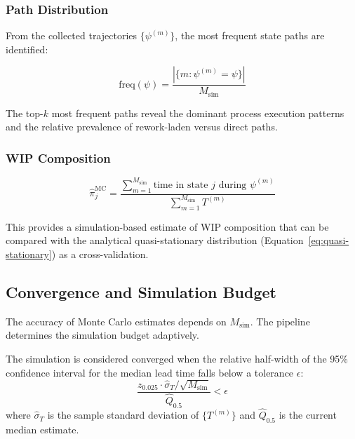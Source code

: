 \subsubsection{Path Distribution}

From the collected trajectories $\{\psi^{(m)}\}$, the most frequent 
state paths are identified:

\begin{equation}
\label{eq:path-freq}
\text{freq}(\psi) = \frac{|\{m : \psi^{(m)} = \psi\}|}{M_{\text{sim}}}
\end{equation}

The top-$k$ most frequent paths reveal the dominant process execution 
patterns and the relative prevalence of rework-laden versus direct 
paths.

\subsubsection{WIP Composition}

\begin{equation}
\label{eq:wip-composition}
\hat{\pi}_j^{\text{MC}} = \frac{\sum_{m=1}^{M_{\text{sim}}} 
    \text{time in state } j \text{ during } \psi^{(m)}}
    {\sum_{m=1}^{M_{\text{sim}}} T^{(m)}}
\end{equation}

This provides a simulation-based estimate of WIP composition that can 
be compared with the analytical quasi-stationary distribution 
(Equation~\ref{eq:quasi-stationary}) as a cross-validation.


\subsection{Convergence and Simulation Budget}
\label{sec:s4-convergence}

The accuracy of Monte Carlo estimates depends on $M_{\text{sim}}$. The 
pipeline determines the simulation budget adaptively.

\begin{definition}
\label{def:convergence}
The simulation is considered converged when the relative half-width of 
the 95\% confidence interval for the median lead time falls below a 
tolerance $\epsilon$:
\begin{equation}
\label{eq:convergence-criterion}
\frac{z_{0.025} \cdot \hat{\sigma}_T / \sqrt{M_{\text{sim}}}}{\hat{Q}_{0.5}} 
    < \epsilon
\end{equation}
where $\hat{\sigma}_T$ is the sample standard deviation of 
$\{T^{(m)}\}$ and $\hat{Q}_{0.5}$ is the current median estimate.
\end{definition}

